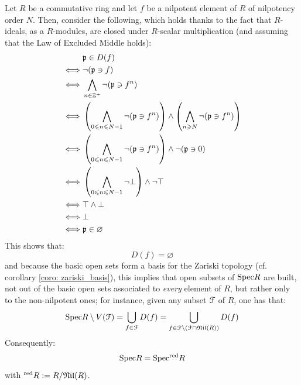                 \begin{example} \label{example: reducedeness_and_nilpotency}
                    Let $R$ be a commutative ring and let $f$ be a nilpotent element of $R$ of nilpotency order $N$. Then, consider the following, which holds thanks to the fact that $R$-ideals, as a $R$-modules, are closed under $R$-scalar multiplication (and assuming that the Law of Excluded Middle holds):
                        $$
                            \begin{aligned}
                                & \mathfrak{p} \in D(f)
                                \\
                                \iff & \neg(\mathfrak{p} \ni f)
                                \\
                                \iff & \bigwedge_{n \in \mathbb{Z}^+} \neg (\mathfrak{p} \ni f^n)
                                \\
                                \iff & \left(\bigwedge_{0 \leqslant n \leqslant N-1} \neg (\mathfrak{p} \ni f^n)\right) \wedge \left(\bigwedge_{n \geqslant N} \neg (\mathfrak{p} \ni f^n)\right)
                                \\
                                \iff & \left(\bigwedge_{0 \leqslant n \leqslant N-1} \neg (\mathfrak{p} \ni f^n)\right) \wedge \neg (\mathfrak{p} \ni 0)
                                \\
                                \iff & \left(\bigwedge_{0 \leqslant n \leqslant N-1} \neg \bot\right) \wedge \neg \top
                                \\
                                \iff & \top \wedge \bot
                                \\
                                \iff & \bot
                                \\
                                \iff & \mathfrak{p} \in \varnothing
                            \end{aligned}
                        $$
                    This shows that:
                        $$D(f) = \varnothing$$
                    and because the basic open sets form a basis for the Zariski topology (cf. corollary \ref{coro: zariski_basis}), this implies that open subsets of $\mathrm{Spec} R$ are built, not out of the basic open sets associated to \textit{every} element of $R$, but rather only to the non-nilpotent ones; for instance, given any subset $\mathcal{F}$ of $R$, one has that:
                        $$\mathrm{Spec} R \setminus V(\mathcal{F}) = \bigcup_{f \in \mathcal{F}} D(f) = \bigcup_{f \in \mathcal{F} \setminus (\mathcal{F} \cap \mathfrak{Nil}(R))} D(f)$$
                    Consequently:
                        $$\mathrm{Spec} R = \mathrm{Spec} {}^{\mathrm{red}}R$$
                    with ${}^{\mathrm{red}}R := R/\mathfrak{Nil}(R)$.
                    

\end{example}
